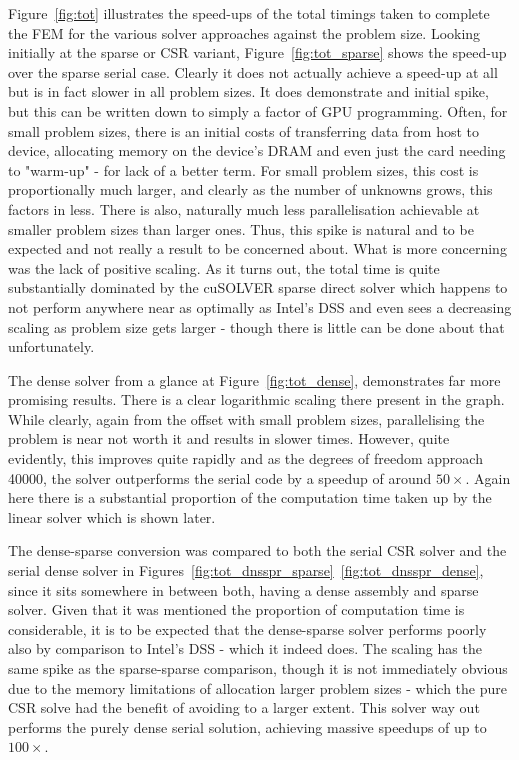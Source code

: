 Figure~\ref{fig:tot} illustrates the speed-ups of the total timings taken to complete the FEM for the various solver approaches against the problem size. Looking initially at the sparse or CSR variant, Figure~\ref{fig:tot_sparse} shows the speed-up over the sparse serial case. Clearly it does not actually achieve a speed-up at all but is in fact slower in all problem sizes. It does demonstrate and initial spike, but this can be written down to simply a factor of GPU programming. Often, for small problem sizes, there is an initial costs of transferring data from host to device, allocating memory on the device's DRAM and even just the card needing to "warm-up" - for lack of a better term.  For small problem sizes, this cost is proportionally much larger, and clearly as the number of unknowns grows, this factors in less. There is also, naturally much less parallelisation achievable at smaller problem sizes than larger ones. Thus, this spike is natural and to be expected and not really a result to be concerned about. What is more concerning was the lack of positive scaling. As it turns out, the total time is quite substantially dominated by the cuSOLVER sparse direct solver which happens to not perform anywhere near as optimally as Intel's DSS and even sees a decreasing scaling as problem size gets larger - though there is little can be done about that unfortunately.

The dense solver from a glance at Figure~\ref{fig:tot_dense}, demonstrates far more promising results. There is a clear logarithmic scaling there present in the graph. While clearly, again from the offset with small problem sizes, parallelising the problem is near not worth it and results in slower times. However, quite evidently, this improves quite rapidly and as the degrees of freedom approach 40000, the solver outperforms the serial code by a speedup of around $50\times$. Again here there is a substantial proportion of the computation time taken up by the linear solver which is shown later.

The dense-sparse conversion was compared to both the serial CSR solver and the serial dense solver in Figures~\ref{fig:tot_dnsspr_sparse}~\ref{fig:tot_dnsspr_dense}, since it sits somewhere in between both, having a dense assembly and sparse solver. Given that it was mentioned the proportion of computation time is considerable, it is to be expected that the dense-sparse solver performs poorly also by comparison to Intel's DSS - which it indeed does. The scaling has the same spike as the sparse-sparse comparison, though it is not immediately obvious due to the memory limitations of allocation larger problem sizes - which the pure CSR solve had the benefit of avoiding to a larger extent. This solver way out performs the purely dense serial solution, achieving massive speedups of up to $100\times$.

